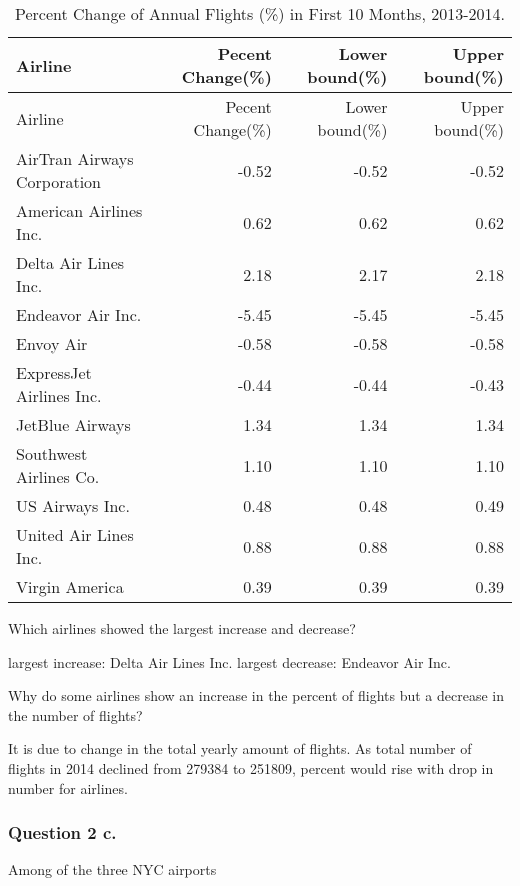 \documentclass[]{article}
\begin{document}
\begin{longtable}[]{@{}lrrr@{}}
\caption{Percent Change of Annual Flights (\%) in First 10 Months,
2013-2014.}\tabularnewline
\toprule
Airline & Pecent Change(\%) & Lower bound(\%) & Upper
bound(\%)\tabularnewline
\midrule
\endfirsthead
\toprule
Airline & Pecent Change(\%) & Lower bound(\%) & Upper
bound(\%)\tabularnewline
\midrule
\endhead
AirTran Airways Corporation & -0.52 & -0.52 & -0.52\tabularnewline
American Airlines Inc. & 0.62 & 0.62 & 0.62\tabularnewline
Delta Air Lines Inc. & 2.18 & 2.17 & 2.18\tabularnewline
Endeavor Air Inc. & -5.45 & -5.45 & -5.45\tabularnewline
Envoy Air & -0.58 & -0.58 & -0.58\tabularnewline
ExpressJet Airlines Inc. & -0.44 & -0.44 & -0.43\tabularnewline
JetBlue Airways & 1.34 & 1.34 & 1.34\tabularnewline
Southwest Airlines Co. & 1.10 & 1.10 & 1.10\tabularnewline
US Airways Inc. & 0.48 & 0.48 & 0.49\tabularnewline
United Air Lines Inc. & 0.88 & 0.88 & 0.88\tabularnewline
Virgin America & 0.39 & 0.39 & 0.39\tabularnewline
\bottomrule
\end{longtable}

Which airlines showed the largest increase and decrease?

largest increase: Delta Air Lines Inc. largest decrease: Endeavor Air
Inc.

Why do some airlines show an increase in the percent of flights but a
decrease in the number of flights?

It is due to change in the total yearly amount of flights. As total
number of flights in 2014 declined from 279384 to 251809, percent would
rise with drop in number for airlines.

\subsubsection{Question 2 c.}\label{question-2-c.}

Among of the three NYC airports
\end{document}
